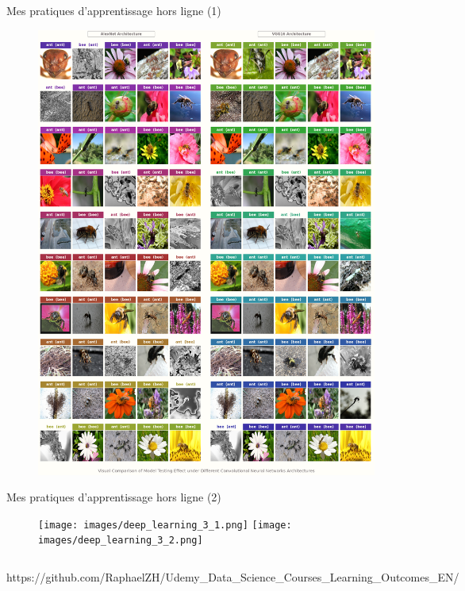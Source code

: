 \documentclass{beamer}
\begin{document}
\begin{frame}[fragile]{Mes pratiques d'apprentissage hors ligne (1)}
\begin{figure}[!htb]
			\centering\includegraphics[width=\linewidth]{images/deep_learning_2.png}
			\endminipage\hfill
			\endminipage
		\end{figure}
	\end{frame}
	
	\begin{frame}[fragile]{Mes pratiques d'apprentissage hors ligne (2)}
		\begin{figure}[!htb]
			\centering\texttt{[image: images/deep\_learning\_3\_1.png]}
			\endminipage\hfill
			\centering\texttt{[image: images/deep\_learning\_3\_2.png]}
			\endminipage
		\end{figure}
		\vspace{-.4em}
		\begin{columns}
			\normalfont\footnotesize{https://github.com/RaphaelZH/Udemy\_Data\_Science\_Courses\_Learning\_Outcomes\_EN/}
		\end{columns}
	\end{frame}
	
\end{document}
